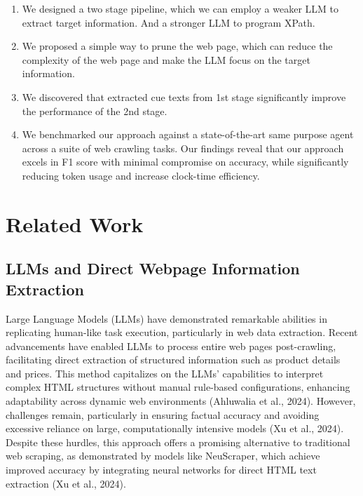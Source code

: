 \documentclass[a4paper]{article}
\begin{document}
\begin{enumerate}
  \item We designed a two stage pipeline, which we can employ a weaker LLM to extract target information. And a stronger LLM to program XPath.
  \item We proposed a simple way to prune the web page, which can reduce the complexity of the web page and make the LLM focus on the target information.
  \item We discovered that extracted cue texts from 1st stage significantly improve the performance of the 2nd stage.
  \item We benchmarked our approach against a state-of-the-art same purpose agent across a suite of web crawling tasks. Our findings reveal that our approach excels in F1 score with minimal compromise on accuracy, while significantly reducing token usage and increase clock-time efficiency.
\end{enumerate}

\section{Related Work}
\subsection{LLMs and Direct Webpage Information Extraction}
Large Language Models (LLMs) have demonstrated remarkable abilities in replicating human-like task execution, particularly in web data extraction. Recent advancements have enabled LLMs to process entire web pages post-crawling, facilitating direct extraction of structured information such as product details and prices. This method capitalizes on the LLMs' capabilities to interpret complex HTML structures without manual rule-based configurations, enhancing adaptability across dynamic web environments (Ahluwalia et al., 2024). However, challenges remain, particularly in ensuring factual accuracy and avoiding excessive reliance on large, computationally intensive models (Xu et al., 2024). Despite these hurdles, this approach offers a promising alternative to traditional web scraping, as demonstrated by models like NeuScraper, which achieve improved accuracy by integrating neural networks for direct HTML text extraction (Xu et al., 2024).
\end{document}
